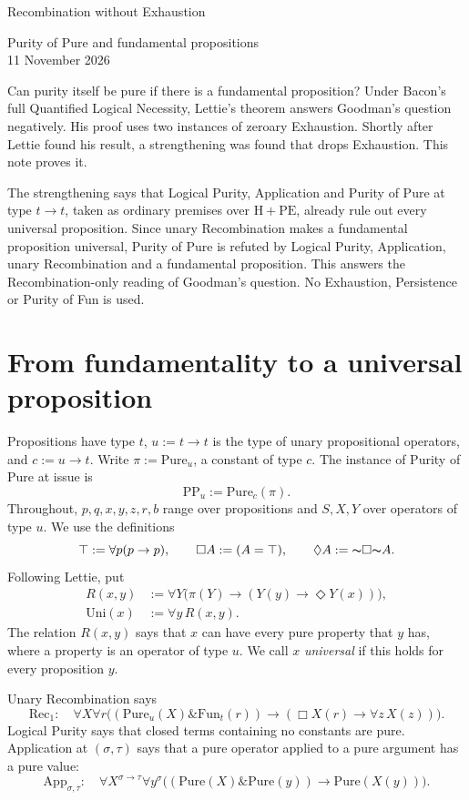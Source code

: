 \documentclass[12pt,leqno]{article}
\newcommand{\AND}{\ensuremath{\mathbin{\&}}}
\newcommand{\IC}{\ensuremath{\rightarrow}}
\newcommand{\NOT}{\ensuremath{\text{$\thicksim$}}}
\newcommand{\Pure}{\ensuremath{\mathrm{Pure}}}
\newcommand{\Fun}{\ensuremath{\mathrm{Fun}}}
\newcommand{\Uni}{\ensuremath{\mathrm{Uni}}}
\newcommand{\PPu}{\ensuremath{\mathrm{PP}_u}}
\newcommand{\HPE}{\ensuremath{\mathrm{H}+\mathrm{PE}}}
\newcommand{\App}{\ensuremath{\mathrm{App}}}
\newcommand{\Rec}{\ensuremath{\mathrm{Rec}_1}}
\theoremstyle{plain}
\begin{document}
\begin{center}
{\Large Recombination without Exhaustion}

\smallskip
Purity of Pure and fundamental propositions\\
11 November 2026
\end{center}

\noindent
Can purity itself be pure if there is a fundamental proposition? Under
Bacon's full Quantified Logical Necessity, Lettie's theorem answers
Goodman's question negatively. His proof uses two instances of zeroary
Exhaustion. Shortly after Lettie found his result, a strengthening was
found that drops Exhaustion. This note proves it.

The strengthening says that Logical Purity, Application and Purity of
Pure at type \(t\IC t\), taken as ordinary premises over \HPE, already
rule out every universal proposition. Since unary Recombination makes a
fundamental proposition universal, Purity of Pure is refuted by Logical
Purity, Application, unary Recombination and a fundamental proposition.
This answers the Recombination-only reading of Goodman's question. No
Exhaustion, Persistence or Purity of Fun is used.

\section{From fundamentality to a universal proposition}

Propositions have type \(t\), \(u:=t\IC t\) is the type of unary
propositional operators, and \(c:=u\IC t\). Write \(\pi:=\Pure_u\), a
constant of type \(c\). The instance of Purity of Pure at issue is
\[
 \PPu:=\Pure_c(\pi).
\]
Throughout, \(p,q,x,y,z,r,b\) range over propositions and \(S,X,Y\) over
operators of type \(u\). We use the definitions
\[
 \top:=\forall p(p\IC p),\qquad \Box A:=(A=\top),\qquad
 \Diamond A:=\NOT\Box\NOT A .
\]
Following Lettie, put
\begin{align}
 R(x,y)&:=\forall Y\bigl(\pi(Y)\IC(Y(y)\IC\Diamond Y(x))\bigr),
   \label{eq:R}\\
 \Uni(x)&:=\forall y\,R(x,y). \label{eq:Uni}
\end{align}
The relation \(R(x,y)\) says that \(x\) can have every pure property that
\(y\) has, where a property is an operator of type \(u\). We call \(x\)
\emph{universal} if this holds for every proposition \(y\).

Unary Recombination says
\[
 \Rec:\quad\forall X\forall r\bigl((\Pure_u(X)\AND\Fun_t(r))
   \IC(\Box X(r)\IC\forall z\,X(z))\bigr).
\]
Logical Purity says that closed terms containing no constants are pure.
Application at \((\sigma,\tau)\) says that a pure operator applied to a
pure argument has a pure value:
\[
 \App_{\sigma,\tau}:\quad\forall X^{\sigma\IC\tau}\forall y^{\sigma}
   \bigl((\Pure(X)\AND\Pure(y))\IC\Pure(X(y))\bigr).
\]
\end{document}
